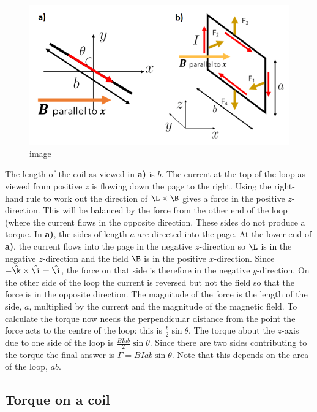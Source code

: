 \documentclass[
]{book}
\begin{document}
\begin{figure}
\centering
\includegraphics[width=120mm,height=\textheight]{Figures/motor_pics.png}
\caption{image}
\end{figure}

The length of the coil as viewed in \textbf{a)} is \(b\). The current at the
top of the loop as viewed from positive \(z\) is flowing down the page to
the right. Using the right-hand rule to work out the direction of
\(\L \times \B\) gives a force in the positive \(z\)-direction. This will be
balanced by the force from the other end of the loop (where the current
flows in the opposite direction. These sides do not produce a torque. In
\textbf{a)}, the sides of length \(a\) are directed into the page. At the lower
end of \textbf{a)}, the current flows into the page in the negative
\(z\)-direction so \(\L\) is in the negative \(z\)-direction and the field
\(\B\) is in the positive \(x\)-direction. Since
\(-\hat{\k} \times \hat{\i} = \hat{\i}\), the force on that side is
therefore in the negative \(y\)-direction. On the other side of the loop
the current is reversed but not the field so that the force is in the
opposite direction. The magnitude of the force is the length of the
side, \(a\), multiplied by the current and the magnitude of the magnetic
field. To calculate the torque now needs the perpendicular distance from
the point the force acts to the centre of the loop: this is
\(\frac{b}{2}\sin\theta\). The torque about the \(z\)-axis due to one side
of the loop is \(\frac{BIab}{2} \sin \theta\). Since there are two sides
contributing to the torque the final answer is
\(\Gamma = BIab \sin\theta\). Note that this depends on the area of the
loop, \(ab\).

\hypertarget{torque-on-a-coil}{%
\subsection{Torque on a coil}\label{torque-on-a-coil}}
\end{document}
